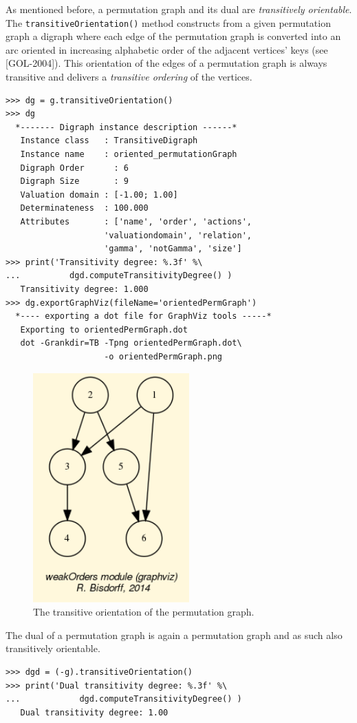 As mentioned before, a permutation graph and its dual are \emph{transitively orientable}. The \texttt{transitiveOrientation()} method constructs from a given permutation graph a digraph where each edge of the permutation graph is converted into an arc oriented in increasing alphabetic order of the adjacent vertices' keys (see [GOL-2004]). This orientation of the edges of a permutation graph is always transitive and delivers a \emph{transitive ordering} of the vertices.
\begin{lstlisting}
>>> dg = g.transitiveOrientation()
>>> dg
  *------- Digraph instance description ------*
   Instance class   : TransitiveDigraph
   Instance name    : oriented_permutationGraph
   Digraph Order      : 6
   Digraph Size       : 9
   Valuation domain : [-1.00; 1.00]
   Determinateness  : 100.000
   Attributes       : ['name', 'order', 'actions',
                    'valuationdomain', 'relation',
                    'gamma', 'notGamma', 'size']
>>> print('Transitivity degree: %.3f' %\
...          dgd.computeTransitivityDegree() ) 
   Transitivity degree: 1.000
>>> dg.exportGraphViz(fileName='orientedPermGraph')
  *---- exporting a dot file for GraphViz tools -----*
   Exporting to orientedPermGraph.dot
   dot -Grankdir=TB -Tpng orientedPermGraph.dot\
                    -o orientedPermGraph.png
\end{lstlisting}
\begin{figure}[h]
\sidecaption
\includegraphics[width=6cm]{Figures/oriented_permutationGraph.png}
\caption{The transitive orientation of the permutation graph.} 
\label{fig:25.7}       %
\end{figure}

The dual of a permutation graph is again a permutation graph and as such also transitively orientable.
\begin{lstlisting}
>>> dgd = (-g).transitiveOrientation()
>>> print('Dual transitivity degree: %.3f' %\
...            dgd.computeTransitivityDegree() )
   Dual transitivity degree: 1.00
\end{lstlisting}

